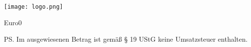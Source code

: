 \documentclass[a4paper]{scrlttr2}
\begin{document}
	\begin{letter}{\customerCompany \\ \customerName \\ 
	\customerStreet \\ \customerZIP \ \customerCity}
	
			\texttt{[image: logo.png]}			
			\opening{\invoiceSalutation}
			\invoiceText
		    \begin{invoice}{Euro}{0}
			    
		    \end{invoice}
		\ps Im ausgewiesenen Betrag ist gemäß § 19 UStG keine Umsatzsteuer 
		enthalten.
		
		\renewcommand*{\raggedsignature}{\raggedright} 
		\closing{\invoiceClosing}
		\invoiceEnclosures



	\end{letter}
\end{document}
